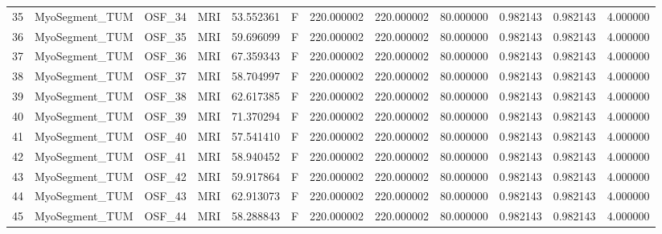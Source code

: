\begin{tabular}{llllrlrrrrrr}
35     &  MyoSegment\_TUM &       OSF\_34 &                MRI &  53.552361 &        F &       220.000002 &    220.000002 &   80.000000 &               0.982143 &            0.982143 &          4.000000 \\
36     &  MyoSegment\_TUM &       OSF\_35 &                MRI &  59.696099 &        F &       220.000002 &    220.000002 &   80.000000 &               0.982143 &            0.982143 &          4.000000 \\
37     &  MyoSegment\_TUM &       OSF\_36 &                MRI &  67.359343 &        F &       220.000002 &    220.000002 &   80.000000 &               0.982143 &            0.982143 &          4.000000 \\
38     &  MyoSegment\_TUM &       OSF\_37 &                MRI &  58.704997 &        F &       220.000002 &    220.000002 &   80.000000 &               0.982143 &            0.982143 &          4.000000 \\
39     &  MyoSegment\_TUM &       OSF\_38 &                MRI &  62.617385 &        F &       220.000002 &    220.000002 &   80.000000 &               0.982143 &            0.982143 &          4.000000 \\
40     &  MyoSegment\_TUM &       OSF\_39 &                MRI &  71.370294 &        F &       220.000002 &    220.000002 &   80.000000 &               0.982143 &            0.982143 &          4.000000 \\
41     &  MyoSegment\_TUM &       OSF\_40 &                MRI &  57.541410 &        F &       220.000002 &    220.000002 &   80.000000 &               0.982143 &            0.982143 &          4.000000 \\
42     &  MyoSegment\_TUM &       OSF\_41 &                MRI &  58.940452 &        F &       220.000002 &    220.000002 &   80.000000 &               0.982143 &            0.982143 &          4.000000 \\
43     &  MyoSegment\_TUM &       OSF\_42 &                MRI &  59.917864 &        F &       220.000002 &    220.000002 &   80.000000 &               0.982143 &            0.982143 &          4.000000 \\
44     &  MyoSegment\_TUM &       OSF\_43 &                MRI &  62.913073 &        F &       220.000002 &    220.000002 &   80.000000 &               0.982143 &            0.982143 &          4.000000 \\
45     &  MyoSegment\_TUM &       OSF\_44 &                MRI &  58.288843 &        F &       220.000002 &    220.000002 &   80.000000 &               0.982143 &            0.982143 &          4.000000 \\

\end{tabular}
